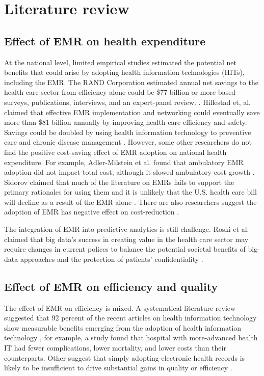 \section{Literature review}

\subsection{Effect of EMR on health expenditure}

At the national level, limited empirical studies estimated the potential net benefits that could arise by adopting health information technologies (HITs), including the EMR. The RAND Corporation estimated annual net savings to the health care sector from efficiency alone could be \$77 billion or more based surveys, publications, interviews, and an expert-panel review. \citep{Rand2005}. Hillestad et, al. claimed that effective EMR implementation and networking could eventually save more than \$81 billion annually by improving health care efficiency and safety. Savings could be doubled by using health information technology to preventive care and chronic disease management \citep{Hillestad2005}. However, some other researchers do not find the positive cost-saving effect of EMR adoption on national health expenditure. For example, Adler-Milstein et al. found that ambulatory EMR adoption did not impact total cost, although it slowed ambulatory cost growth \citep{Adler-Milstein2013}. Sidorov claimed that much of the literature on EMRs fails to support the primary rationales for using them and it is unlikely that the U.S. health care bill will decline as a result of the EMR alone \citep{Sidorov2006}. There are also researchers suggest the adoption of EMR has negative effect on cost-reduction  \citep{Teufel2012}.

The integration of EMR into predictive analytics is still challenge. Roski et al. claimed that big data's success in creating value in the health care sector may require changes in current polices to balance the potential societal benefits of big-data approaches and the protection of patients' confidentiality \citep{Roski2014}.

\subsection{Effect of EMR on efficiency and quality}

The effect of EMR on efficiency is mixed. A systematical literature review suggested that 92 percent of the recent articles on health information technology show measurable benefits emerging from the adoption of health information technology \citep{Buntin2011}, for example, a study found that hospital with more-advanced health IT had fewer complications, lower mortality, and lower costs than their counterparts\citep{amarasingham2009clinical}. Other suggest that simply adopting electronic health records is likely to be insufficient to drive substantial gains in quality or efficiency \citep{DesRoches2010}. 

